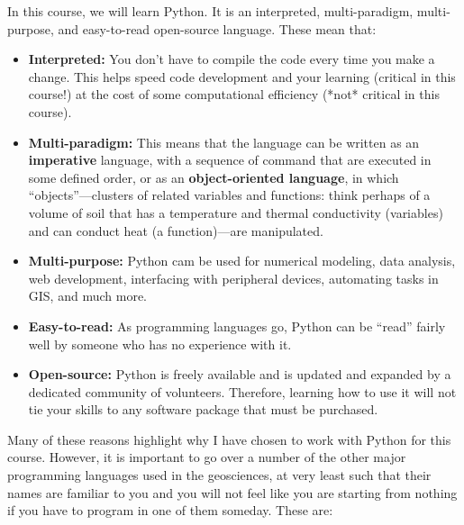 \documentclass[a4paper,10pt]{scrartcl}
\begin{document}
In this course, we will learn Python. It is an interpreted, multi-paradigm, multi-purpose, and easy-to-read open-source language. These mean that:
\begin{itemize}
 \item \textbf{Interpreted:} You don't have to compile the code every time you make a change. This helps speed code development and your learning (critical in this course!) at the cost of some computational efficiency (*not* critical in this course).
 \item \textbf{Multi-paradigm:} This means that the language can be written as an \textbf{imperative} language, with a sequence of command that are executed in some defined order, or as an \textbf{object-oriented language}, in which ``objects''---clusters of related variables and functions: think perhaps of a volume of soil that has a temperature and thermal conductivity (variables) and can conduct heat (a function)---are manipulated.
 \item \textbf{Multi-purpose:} Python cam be used for numerical modeling, data analysis, web development, interfacing with peripheral devices, automating tasks in GIS, and much more.
 \item \textbf{Easy-to-read:} As programming languages go, Python can be ``read'' fairly well by someone who has no experience with it.
 \item \textbf{Open-source:} Python is freely available and is updated and expanded by a dedicated community of volunteers. Therefore, learning how to use it will not tie your skills to any software package that must be purchased.
\end{itemize}
Many of these reasons highlight why I have chosen to work with Python for this course. However, it is important to go over a number of the other major programming languages used in the geosciences, at very least such that their names are familiar to you and you will not feel like you are starting from nothing if you have to program in one of them someday. These are:
\end{document}
